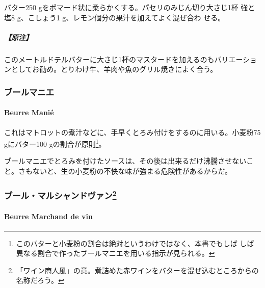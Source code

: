 \begin{recette}
バター250 gをポマード状に柔らかくする。パセリのみじん切り大さじ1杯
強と塩8 g、こしょう1 g、レモン\unquart{}個分の果汁を加えてよく混ぜ合わ
せる。

\hypertarget{ux539fux6ce8-2}{%
\subparagraph{【原注】}\label{ux539fux6ce8-2}}

このメートルドテルバターに大さじ1杯のマスタードを加えるのもバリエーショ
ンとしてお勧め。とりわけ牛、羊肉や魚のグリル焼きによく合う。

\maeaki

\hypertarget{ux30d6ux30fcux30ebux30deux30cbux30a8}{%
\subsubsection{ブールマニエ}\label{ux30d6ux30fcux30ebux30deux30cbux30a8}}

\hypertarget{beurre-manie}{%
\paragraph{Beurre Manié}\label{beurre-manie}}


これはマトロットの煮汁などに、手早くとろみ付けをするのに用いる。小麦粉75
gにバター100 gの割合が原則\footnote{このバターと小麦粉の割合は絶対というわけではなく、本書でもしば
  しば異なる割合で作ったブールマニエを用いる指示が見られる。}。

ブールマニエでとろみを付けたソースは、その後は出来るだけ沸騰させないこ
と。さもないと、生の小麦粉の不快な味が強まる危険性があるからだ。

\maeaki

\hypertarget{ux30d6ux30fcux30ebux30deux30ebux30b7ux30e3ux30f3ux30c9ux30f4ux30a1ux30f330}{%
\subsubsection[ブール・マルシャンドヴァン]{\texorpdfstring{ブール・マルシャンドヴァン\footnote{「ワイン商人風」の意。煮詰めた赤ワインをバターを混ぜ込むところからの名称だろう。}}{ブール・マルシャンドヴァン}}\label{ux30d6ux30fcux30ebux30deux30ebux30b7ux30e3ux30f3ux30c9ux30f4ux30a1ux30f330}}

\hypertarget{beurre-marchand-de-vin}{%
\paragraph{Beurre Marchand de vin}\label{beurre-marchand-de-vin}}


\end{recette}
